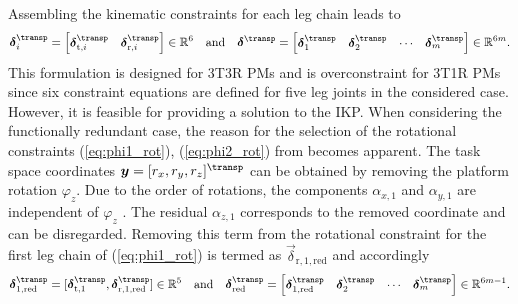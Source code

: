 \documentclass[
	graybox,
	vecphys] %
	{svmult}
\newcommand{\Res}[0]{\vec{\delta}}
\begin{document}
Assembling the kinematic constraints for each leg chain leads to 
%
\begin{equation}
\vspace{-0.1cm}
\Res_i^\transp=\begin{bmatrix}
\Res_{\mathrm{t},i}^\transp & \Res_{\mathrm{r},i}^\transp
\end{bmatrix} \in {\mathbb{R}}^{6}
\quad \mathrm{and} \quad
\Res^\transp
=
\begin{bmatrix}
\Res_1^\transp &
\Res_2^\transp &
\cdots &
\Res_m^\transp
\end{bmatrix} \in {\mathbb{R}}^{6m}.
\label{eq:constr}
\end{equation}
%
This formulation is designed for 3T3R PMs and is overconstraint for 3T1R PMs since six constraint equations are defined for five leg joints in the considered case.
However, it is feasible for providing a solution to the IKP. %
%
When considering the functionally redundant case, the reason for the selection of the rotational constraints (\ref{eq:phi1_rot}), (\ref{eq:phi2_rot}) from \cite{SchapplerTapOrt2019} becomes apparent.
The task space coordinates
$\vec{y}
=
[r_x,r_y,r_z]^\transp
$
can be obtained by removing the platform rotation $\varphi_z$.
Due to the order of rotations, the components $\alpha_{x,1}$ and $\alpha_{y,1}$ are independent of $\varphi_z$ \cite{SchapplerTapOrt2019}.
The residual $\alpha_{z,1}$ corresponds to the removed coordinate and can be disregarded.
Removing this term from the rotational constraint for the first leg chain of (\ref{eq:phi1_rot}) is termed as $\Res_{\mathrm{r},1,\mathrm{red}}$ and accordingly
%
\begin{equation}
\Res_{1,\mathrm{red}}^\transp=[\Res_{\mathrm{t},1}^\transp, \Res_{\mathrm{r},1,\mathrm{red}}^\transp] \in \mathbb{R}^5
\quad \mathrm{and} \quad
\Res_\mathrm{red}^\transp
=
\begin{bmatrix}
\Res_{1,\mathrm{red}}^\transp &
\Res_2^\transp &
\cdots &
\Res_m^\transp
\end{bmatrix} \in {\mathbb{R}}^{6m-1}.
\vspace{-0.1cm}
\label{equ:constr_red}
\end{equation}
\end{document}
